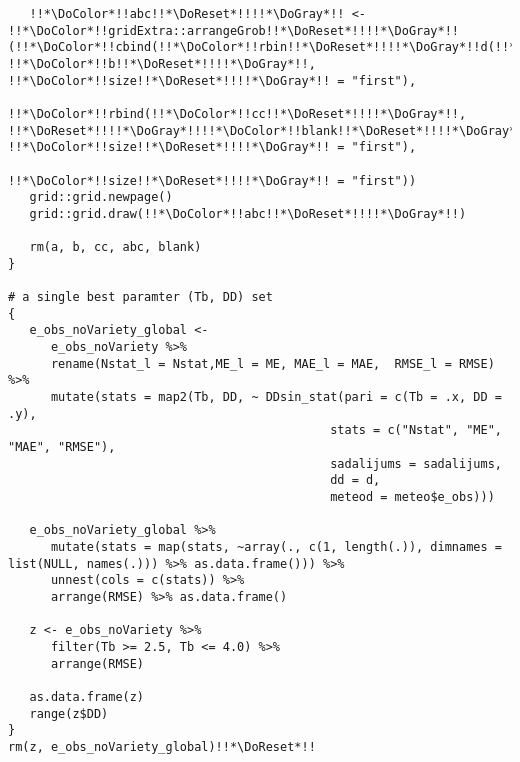 \begin{verbatim}
   !!*\DoColor*!!abc!!*\DoReset*!!!!*\DoGray*!! <- !!*\DoColor*!!gridExtra::arrangeGrob!!*\DoReset*!!!!*\DoGray*!!(!!*\DoColor*!!cbind(!!*\DoColor*!!rbin!!*\DoReset*!!!!*\DoGray*!!d(!!*\DoColor*!!a!!*\DoReset*!!!!*\DoGray*!!, !!*\DoColor*!!b!!*\DoReset*!!!!*\DoGray*!!, !!*\DoColor*!!size!!*\DoReset*!!!!*\DoGray*!! = "first"),
                                       !!*\DoColor*!!rbind(!!*\DoColor*!!cc!!*\DoReset*!!!!*\DoGray*!!, !!*\DoReset*!!!!*\DoGray*!!!!*\DoColor*!!blank!!*\DoReset*!!!!*\DoGray*!!, !!*\DoColor*!!size!!*\DoReset*!!!!*\DoGray*!! = "first"),
                                       !!*\DoColor*!!size!!*\DoReset*!!!!*\DoGray*!! = "first"))
   grid::grid.newpage()
   grid::grid.draw(!!*\DoColor*!!abc!!*\DoReset*!!!!*\DoGray*!!)

   rm(a, b, cc, abc, blank)
}

# a single best paramter (Tb, DD) set
{
   e_obs_noVariety_global <-
      e_obs_noVariety %>%
      rename(Nstat_l = Nstat,ME_l = ME, MAE_l = MAE,  RMSE_l = RMSE) %>%
      mutate(stats = map2(Tb, DD, ~ DDsin_stat(pari = c(Tb = .x, DD = .y),
                                             stats = c("Nstat", "ME", "MAE", "RMSE"),
                                             sadalijums = sadalijums,
                                             dd = d,
                                             meteod = meteo$e_obs)))

   e_obs_noVariety_global %>%
      mutate(stats = map(stats, ~array(., c(1, length(.)), dimnames = list(NULL, names(.))) %>% as.data.frame())) %>%
      unnest(cols = c(stats)) %>%
      arrange(RMSE) %>% as.data.frame()

   z <- e_obs_noVariety %>%
      filter(Tb >= 2.5, Tb <= 4.0) %>%
      arrange(RMSE)

   as.data.frame(z)
   range(z$DD)
}
rm(z, e_obs_noVariety_global)!!*\DoReset*!!
\end{verbatim}
\endpreview
